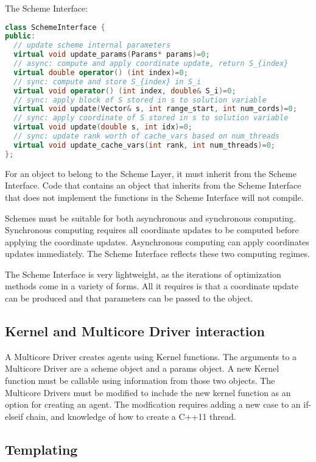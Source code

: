 The Scheme Interface:
\begin{lstlisting}[language=C++]
class SchemeInterface {
public:
  // update scheme internal parameters
  virtual void update_params(Params* params)=0;
  // async: compute and apply coordinate update, return S_{index}
  virtual double operator() (int index)=0;
  // sync: compute and store S_{index} in S_i
  virtual void operator() (int index, double& S_i)=0;
  // sync: apply block of S stored in s to solution variable
  virtual void update(Vector& s, int range_start, int num_cords)=0;
  // sync: apply coordinate of S stored in s to solution variable
  virtual void update(double s, int idx)=0;
  // sync: update rank worth of cache_vars based on num_threads
  virtual void update_cache_vars(int rank, int num_threads)=0;
};
\end{lstlisting}
For an object to belong to the Scheme Layer, it must inherit from the Scheme Interface.
Code that contains an object that inherits from the Scheme Interface that does not implement the functions in the Scheme Interface will not compile.

Schemes must be suitable for both asynchronous and synchronous computing. Synchronous computing requires all coordinate updates to be computed before applying the coordinate updates. Asynchronous computing can apply coordinates updates immediately. The Scheme Interface reflects these two computing regimes.

The Scheme Interface is very lightweight, as the iterations of optimization methods come in a variety of forms.  All it requires is that a coordinate update can be produced and that parameters can be passed to the object.

 


\subsection{Kernel and Multicore Driver interaction}

A Multicore Driver creates agents using Kernel functions. The arguments to a Multicore Driver are a scheme object and a params object. A new Kernel function must be callable using information from those two objects. The Multicore Drivers must be modified to include the new kernel function as an option for creating an agent. The modfication requires adding a new case to an if-elseif chain, and knowledge of how to create a C++11 thread.

\subsection{Templating}

